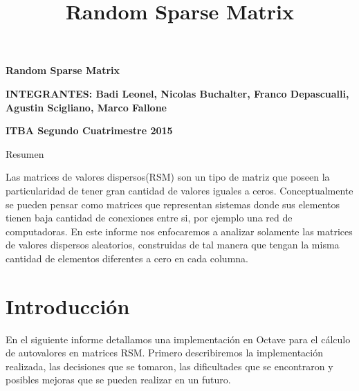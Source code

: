 \documentclass[a4paper,10pt]{article}
\title{Random Sparse Matrix}
\begin{document}
\begin{center}
\textbf{\Huge{Random Sparse Matrix}}
\end{center}

\vspace{10mm}

\begin{center}
\textbf{INTEGRANTES: Badi Leonel, Nicolas Buchalter, Franco Depascualli, Agustin Scigliano, Marco Fallone}

\textbf{ITBA Segundo Cuatrimestre 2015}
\end{center}

\begin{center}
\end{center}

\vspace{10mm}

\begin{center}
\begin{large}
Resumen
\end{large}
\end{center}

Las matrices de valores dispersos(RSM) son un tipo de matriz que poseen la particularidad de tener gran cantidad de valores iguales a ceros. Conceptualmente se pueden pensar como matrices que representan sistemas donde sus elementos tienen baja cantidad de conexiones entre si, por ejemplo una red de computadoras. En este informe nos enfocaremos a analizar solamente las matrices de valores dispersos aleatorios, construidas de tal manera que tengan la misma cantidad de elementos diferentes a cero en cada columna. 

\section{Introducción}
En el siguiente informe detallamos una implementación en Octave para el cálculo de autovalores en matrices RSM. Primero describiremos la implementación realizada, las decisiones que se tomaron, las dificultades que se encontraron y posibles mejoras que se pueden realizar en un futuro.
\end{document}
